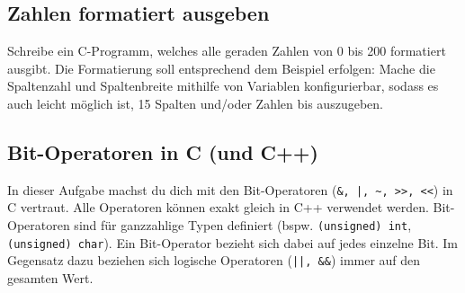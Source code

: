 \subsection{Zahlen formatiert ausgeben}
\label{sec:CFormatNumbers}
Schreibe ein C-Programm, welches alle geraden Zahlen von 0 bis 200 formatiert ausgibt.
Die Formatierung soll entsprechend dem Beispiel erfolgen:
%
%
Mache die Spaltenzahl und Spaltenbreite mithilfe von Variablen konfigurierbar, sodass es auch leicht möglich ist, 15 Spalten und/oder Zahlen bis  auszugeben.

\subsection{Bit-Operatoren in C (und C++)}
\label{task:bitops}

In dieser Aufgabe machst du dich mit den Bit-Operatoren (\lstinline{&, |, ~, >>, <<}) in C vertraut.
Alle Operatoren können exakt gleich in C++ verwendet werden.
Bit-Operatoren sind für ganzzahlige Typen definiert (bspw. \lstinline|(unsigned) int|, \lstinline|(unsigned) char|).
Ein Bit-Operator bezieht sich dabei auf jedes einzelne Bit.
Im Gegensatz dazu beziehen sich logische Operatoren (\lstinline{||, &&}) immer auf den gesamten Wert.

